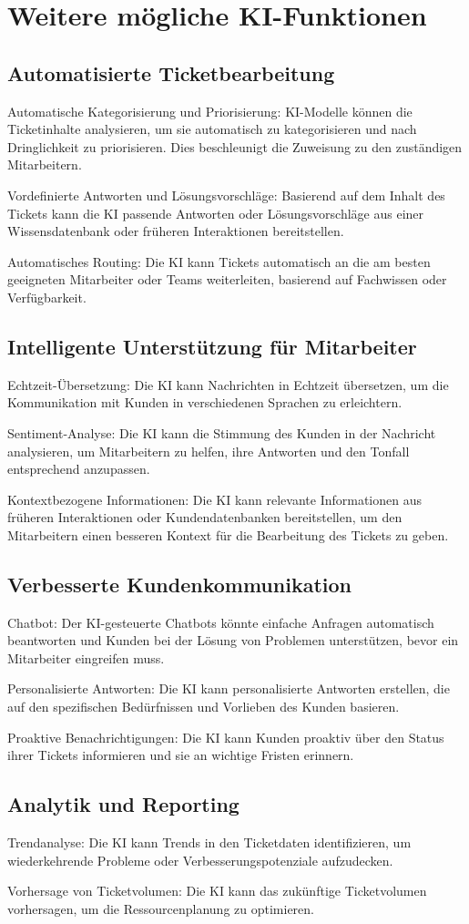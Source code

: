 \section{Weitere mögliche KI-Funktionen}

\subsection{Automatisierte Ticketbearbeitung}
Automatische Kategorisierung und Priorisierung: KI-Modelle können die Ticketinhalte analysieren, um sie automatisch zu kategorisieren und nach Dringlichkeit zu priorisieren. Dies beschleunigt die Zuweisung zu den zuständigen Mitarbeitern.

Vordefinierte Antworten und Lösungsvorschläge: Basierend auf dem Inhalt des Tickets kann die KI passende Antworten oder Lösungsvorschläge aus einer Wissensdatenbank oder früheren Interaktionen bereitstellen.

Automatisches Routing: Die KI kann Tickets automatisch an die am besten geeigneten Mitarbeiter oder Teams weiterleiten, basierend auf Fachwissen oder Verfügbarkeit.

\subsection{Intelligente Unterstützung für Mitarbeiter}
Echtzeit-Übersetzung: Die KI kann Nachrichten in Echtzeit übersetzen, um die Kommunikation mit Kunden in verschiedenen Sprachen zu erleichtern.

Sentiment-Analyse: Die KI kann die Stimmung des Kunden in der Nachricht analysieren, um Mitarbeitern zu helfen, ihre Antworten und den Tonfall entsprechend anzupassen.

Kontextbezogene Informationen: Die KI kann relevante Informationen aus früheren Interaktionen oder Kundendatenbanken bereitstellen, um den Mitarbeitern einen besseren Kontext für die Bearbeitung des Tickets zu geben.

\subsection{Verbesserte Kundenkommunikation}
Chatbot: Der KI-gesteuerte Chatbots könnte einfache Anfragen automatisch beantworten und Kunden bei der Lösung von Problemen unterstützen, bevor ein Mitarbeiter eingreifen muss.

Personalisierte Antworten: Die KI kann personalisierte Antworten erstellen, die auf den spezifischen Bedürfnissen und Vorlieben des Kunden basieren.

Proaktive Benachrichtigungen: Die KI kann Kunden proaktiv über den Status ihrer Tickets informieren und sie an wichtige Fristen erinnern.

\subsection{Analytik und Reporting}
Trendanalyse: Die KI kann Trends in den Ticketdaten identifizieren, um wiederkehrende Probleme oder Verbesserungspotenziale aufzudecken.

Vorhersage von Ticketvolumen: Die KI kann das zukünftige Ticketvolumen vorhersagen, um die Ressourcenplanung zu optimieren.